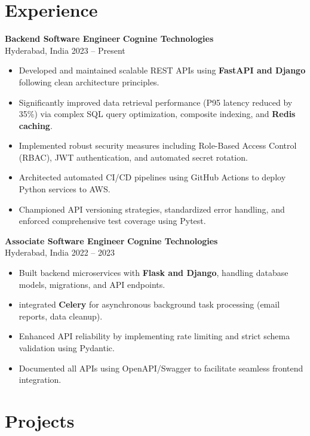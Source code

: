 \documentclass[11pt]{article}
\begin{document}
\section*{Experience}

\textbf{Backend Software Engineer} \hfill \textbf{Cognine Technologies} \\
Hyderabad, India \hfill 2023 -- Present
\begin{itemize}
    \item Developed and maintained scalable REST APIs using \textbf{FastAPI and Django} following clean architecture principles.
    \item Significantly improved data retrieval performance (P95 latency reduced by 35\%) via complex SQL query optimization, composite indexing, and \textbf{Redis caching}.
    \item Implemented robust security measures including Role-Based Access Control (RBAC), JWT authentication, and automated secret rotation.
    \item Architected automated CI/CD pipelines using GitHub Actions to deploy Python services to AWS.
    \item Championed API versioning strategies, standardized error handling, and enforced comprehensive test coverage using Pytest.
\end{itemize}

\textbf{Associate Software Engineer} \hfill \textbf{Cognine Technologies} \\
Hyderabad, India \hfill 2022 -- 2023
\begin{itemize}
    \item Built backend microservices with \textbf{Flask and Django}, handling database models, migrations, and API endpoints.
    \item integrated \textbf{Celery} for asynchronous background task processing (email reports, data cleanup).
    \item Enhanced API reliability by implementing rate limiting and strict schema validation using Pydantic.
    \item Documented all APIs using OpenAPI/Swagger to facilitate seamless frontend integration.
\end{itemize}

\section*{Projects}
\end{document}
